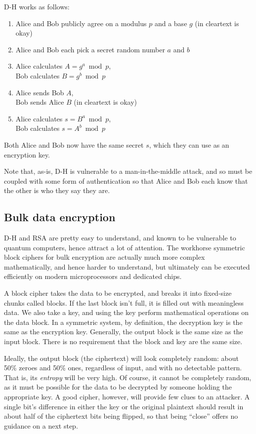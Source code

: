 D-H works as follows:

\begin{enumerate}
  \item Alice and Bob publicly agree on a modulus $p$ and a base $g$ (in cleartext is okay)
  \item Alice and Bob each pick a secret random number $a$ and $b$
  \item Alice calculates $A = g^a \bmod p$, \\
    Bob calculates $B = g^b \bmod p$
  \item Alice sends Bob $A$, \\
Bob sends Alice $B$ (in cleartext is okay)
  \item Alice calculates $s = B^a \bmod p$, \\
	   Bob calculates $s = A^b \bmod p$
\end{enumerate}

Both Alice and Bob now have the same secret $s$, which they can use as
an encryption key.

Note that, as-is, D-H is vulnerable to a man-in-the-middle attack, and
so must be coupled with some form of authentication so that Alice and
Bob each know that the other is who they say they are.

\subsection{Bulk data encryption}

D-H and RSA are pretty easy to understand, and known to be vulnerable
to quantum computers, hence attract a lot of attention. The workhorse
symmetric block ciphers for bulk encryption are actually much more
complex mathematically, and hence harder to understand, but ultimately
can be executed efficiently on modern microprocessors and dedicated
chips. 

A block cipher takes the data to be encrypted, and breaks it into
fixed-size chunks called blocks.  If the last block isn't full, it is
filled out with meaningless data.  We also take a key, and using the
key perform mathematical operations on the data block.  In a symmetric
system, by definition, the decryption key is the same as the
encryption key.  Generally, the output block is the same size as the
input block.  There is no requirement that the block and key are the
same size.

Ideally, the output block (the ciphertext) will look completely
random: about 50\% zeroes and 50\% ones, regardless of input, and with
no detectable pattern.  That is, its \emph{entropy} will be very high.  Of
course, it cannot be completely random, as it must be possible for the
data to be decrypted by someone holding the appropriate key.  A good
cipher, however, will provide few clues to an attacker.  A single
bit's difference in either the key or the original plaintext should
result in about half of the ciphertext bits being flipped, so that
being ``close'' offers no guidance on a next step.

